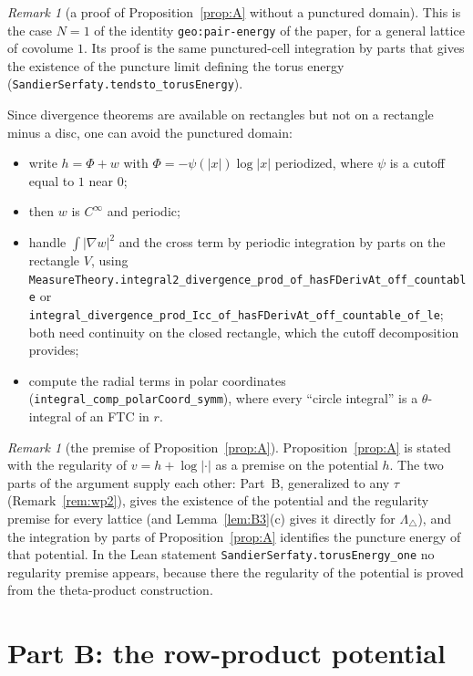 \documentclass[11pt]{article}
\theoremstyle{definition}
\theoremstyle{remark}
\newtheorem{remark}[theorem]{Remark}
\newcommand{\Ltri}{\Lambda_{\triangle}}
\newcommand{\lean}[1]{\texttt{#1}}
\begin{document}
\begin{remark}[a proof of Proposition~\ref{prop:A} without a punctured domain]\label{rem:A}
This is the case $N=1$ of the identity \texttt{geo:pair-energy} of the paper, for a general
lattice of covolume $1$. Its proof is the same punctured-cell integration by parts that gives the existence of the
puncture limit defining the torus energy (\lean{SandierSerfaty.tendsto\_torusEnergy}).

Since divergence theorems are available on rectangles but not on a rectangle minus a disc, one can avoid the
punctured domain:
\begin{itemize}
\item write $h=\Phi+w$ with $\Phi=-\psi(|x|)\log|x|$ periodized, where $\psi$ is a cutoff equal to $1$ near $0$;
\item then $w$ is $C^\infty$ and periodic;
\item handle $\int|\nabla w|^2$ and the cross term by periodic integration by parts on the rectangle $V$, using
\lean{MeasureTheory.integral2\_divergence\_prod\_of\_hasFDerivAt\_off\_countable} or
\lean{integral\_divergence\_prod\_Icc\_of\_hasFDerivAt\_off\_countable\_of\_le}; both need continuity on
the closed rectangle, which the cutoff decomposition provides;
\item compute the radial terms in polar coordinates (\lean{integral\_comp\_polarCoord\_symm}), where every
``circle integral'' is a $\theta$-integral of an FTC in $r$.
\end{itemize}
\end{remark}

\begin{remark}[the premise of Proposition~\ref{prop:A}]\label{rem:A-interface}
Proposition~\ref{prop:A} is stated with the regularity of $v=h+\log|\cdot|$ as a premise on the potential $h$.
The two parts of the argument supply each other: Part~B, generalized to any $\tau$ (Remark~\ref{rem:wp2}), gives
the existence of the potential and the regularity premise for every lattice (and Lemma~\ref{lem:B3}(c) gives
it directly for $\Ltri$), and the integration by parts of Proposition~\ref{prop:A} identifies the puncture energy
of that potential. In the Lean statement \lean{SandierSerfaty.torusEnergy\_one} no regularity premise appears,
because there the regularity of the potential is proved from the theta-product construction.
\end{remark}

\section{Part B: the row-product potential}
\end{document}
